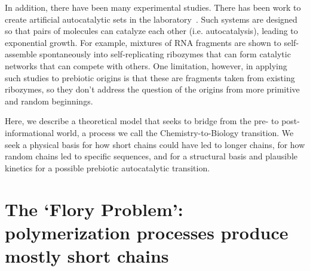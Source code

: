 \documentclass[journal=jacsat,manuscript=article,layout=twocolumn]{achemso}
\begin{document}
 In addition, there have been many experimental studies.  There has been work to create artificial 
autocatalytic sets in the laboratory~\cite{VonKiedrowski1986,Lincoln2009,Vaidya2012}. Such systems 
are designed so that pairs of molecules can catalyze each other (i.e. autocatalysis), leading to 
exponential growth.  For example, mixtures of RNA fragments are shown to self-assemble spontaneously 
into self-replicating ribozymes that can form catalytic networks that can compete with others.  One 
limitation, however, in applying such studies to prebiotic origins is that these are fragments taken 
from existing ribozymes, so they don't address the question of the origins from more primitive and 
random beginnings.
 
  Here, we describe a theoretical model that seeks to bridge from the pre- to post-informational 
world, a process we call the Chemistry-to-Biology transition.  We seek a physical basis for how 
short chains could have led to longer chains, for how random chains led to specific sequences, and 
for a structural basis and plausible kinetics for a possible prebiotic autocatalytic transition.
   
 \section{The `Flory Problem': polymerization processes produce mostly short chains}
 \label{sec:flory} 
\end{document}
